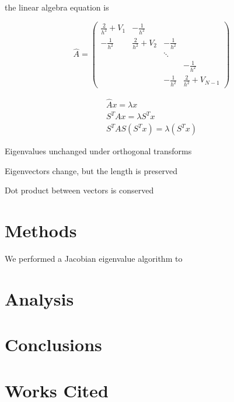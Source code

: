 \documentclass{article}
\begin{document}
the linear algebra equation is

\begin{equation}
\hat{A} = 
\left( \begin{array}{cccc}
	 \frac{2}{h^2} + V_1 &    -\frac{1}{h^2}   &                &                        \\
	-\frac{1}{h^2}       & \frac{2}{h^2} + V_2 & -\frac{1}{h^2} &                        \\
	                     &                     &     \ddots     &                        \\
	                     &                     &                &    -\frac{1}{h^2}      \\
	                     &                     & -\frac{1}{h^2} & \frac{2}{h^2} + V_{N-1}
   \end{array} \right)
\end{equation}

\begin{eqnarray}
\hat{A} x = \lambda x \\
S^T A x = \lambda S^T x \\
S^T A S (S^T x) = \lambda (S^T x)
\end{eqnarray}

Eigenvalues unchanged under orthogonal transforms

Eigenvectors change, but the length is preserved

Dot product between vectors is conserved

\section{Methods}

We performed a Jacobian eigenvalue algorithm to 

\section{Analysis}

\section{Conclusions}

\section{Works Cited}
\end{document}
